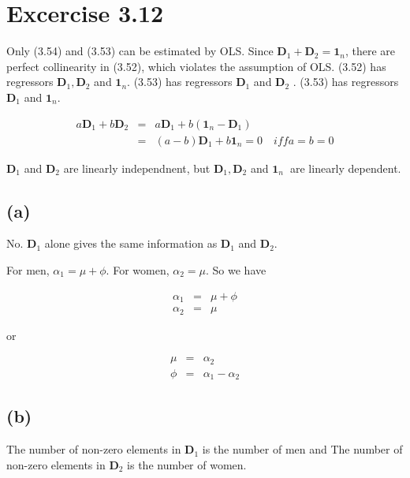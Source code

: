 \documentclass{article}
\begin{document}
\section*{Excercise 3.12}

Only (3.54) and (3.53) can be estimated by OLS. Since $\mathbf{D}_{1}+%
\mathbf{D}_{2}=\mathbf{1}_{n}$, there are perfect collinearity in (3.52),
which violates the assumption of OLS. (3.52) has regressors $\mathbf{D}_{1},%
\mathbf{D}_{2}$ and $\mathbf{1}_{n}$. (3.53)  has regressors $\mathbf{D}_{1}$
and $\mathbf{D}_{2}$ . (3.53) has regressors $\mathbf{D}_{1}$ and $\mathbf{1}%
_{n}$. $\ $

\begin{eqnarray*}
a\mathbf{D}_{1}+b\mathbf{D}_{2} &=&a\mathbf{D}_{1}+b\left( \mathbf{1}_{n}-%
\mathbf{D}_{1}\right)  \\
&=&\left( a-b\right) \mathbf{D}_{1}+b\mathbf{1}_{n}=0\quad iffa=b=0
\end{eqnarray*}

$\mathbf{D}_{1}$ and $\mathbf{D}_{2}$ are linearly independnent, but $%
\mathbf{D}_{1},\mathbf{D}_{2}$ and $\mathbf{1}_{n}$\textbf{\ }are linearly
dependent.

\subsection*{(a)}

No. $\mathbf{D}_{1}$ alone gives the same information as $\mathbf{D}_{1}$
and $\mathbf{D}_{2}.$

For men, $\alpha _{1}=\mu +\phi .$ For women, $\alpha _{2}=\mu .$ So we have

\begin{eqnarray*}
\alpha _{1} &=&\mu +\phi \\
\alpha _{2} &=&\mu
\end{eqnarray*}

or

\begin{eqnarray*}
\mu &=&\alpha _{2} \\
\phi &=&\alpha _{1}-\alpha _{2}
\end{eqnarray*}

\subsection*{(b)}

The number of non-zero elements in $\mathbf{D}_{1}$ is the number of men and
The number of non-zero elements in $\mathbf{D}_{2}$ is the number of women.
\end{document}

